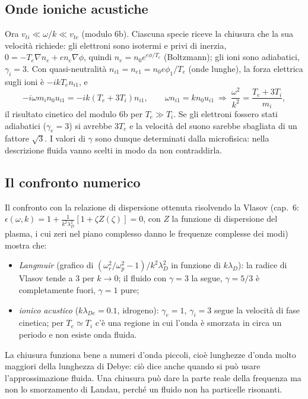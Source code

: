 \subsection{Onde ioniche acustiche}
Ora $v_{ti}\ll\omega/k\ll v_{te}$ (modulo 6b). Ciascuna specie riceve la chiusura che la sua velocità richiede: gli elettroni sono isotermi e privi di inerzia, $0=-T_e\nabla n_e+en_e\nabla\phi$, quindi $n_e=n_0e^{e\phi/T_e}$ (Boltzmann); gli ioni sono adiabatici, $\gamma_i=3$. Con quasi-neutralità $n_{i1}=n_{e1}=n_0e\phi_1/T_e$ (onde lunghe), la forza elettrica sugli ioni è $-ikT_en_{i1}$, e
\begin{equation}
-i\omega m_in_0u_{i1}=-ik(T_e+3T_i)n_{i1},\qquad\omega n_{i1}=kn_0u_{i1}\ \Rightarrow\ \frac{\omega^2}{k^2}=\frac{T_e+3T_i}{m_i},
\end{equation}
il risultato cinetico del modulo 6b per $T_e\gg T_i$. Se gli elettroni fossero stati adiabatici ($\gamma_e=3$) si avrebbe $3T_e$ e la velocità del suono sarebbe sbagliata di un fattore $\sqrt3$. I valori di $\gamma$ sono dunque determinati dalla microfisica: nella descrizione fluida vanno scelti in modo da non contraddirla.

\subsection{Il confronto numerico}
Il confronto con la relazione di dispersione ottenuta risolvendo la Vlasov (cap.~6: $\epsilon(\omega,k)=1+\frac{1}{k^2\lambda_D^2}[1+\zeta Z(\zeta)]=0$, con $Z$ la funzione di dispersione del plasma, i cui zeri nel piano complesso danno le frequenze complesse dei modi) mostra che:
\begin{itemize}
\item \textit{Langmuir} (grafico di $(\omega_r^2/\omega_p^2-1)/k^2\lambda_D^2$ in funzione di $k\lambda_D$): la radice di Vlasov tende a 3 per $k\to0$; il fluido con $\gamma=3$ la segue, $\gamma=5/3$ è completamente fuori, $\gamma=1$ pure;
\item \textit{ionico acustico} ($k\lambda_{De}=0.1$, idrogeno): $\gamma_e=1$, $\gamma_i=3$ segue la velocità di fase cinetica; per $T_e\simeq T_i$ c'è una regione in cui l'onda è smorzata in circa un periodo e non esiste onda fluida.
\end{itemize}
La chiusura funziona bene a numeri d'onda piccoli, cioè lunghezze d'onda molto maggiori della lunghezza di Debye: ciò dice anche quando si può usare l'approssimazione fluida. Una chiusura può dare la parte reale della frequenza ma non lo smorzamento di Landau, perché un fluido non ha particelle risonanti.

